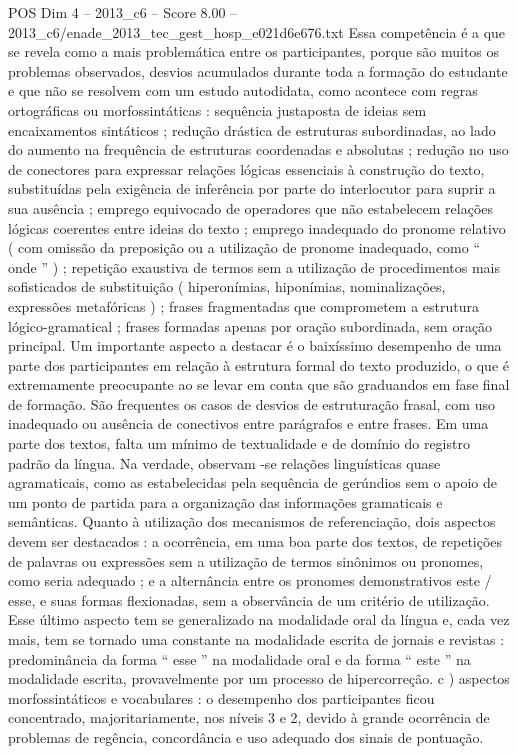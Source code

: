 \begin{textsample}{POS Dim 4 – 2013\_c6 – Score 8.00 – 2013\_c6/enade\_2013\_tec\_gest\_hosp\_e021d6e676.txt}
Essa competência é a que se revela como a mais problemática entre os participantes, porque são muitos os problemas observados, desvios acumulados durante toda a formação do estudante e que não se resolvem com um estudo autodidata, como acontece com regras ortográficas ou morfossintáticas : sequência justaposta de ideias sem encaixamentos sintáticos ; redução drástica de estruturas subordinadas, ao lado do aumento na frequência de estruturas coordenadas e absolutas ; redução no uso de conectores para expressar relações lógicas essenciais à construção do texto, substituídas pela exigência de inferência por parte do interlocutor para suprir a sua ausência ; emprego equivocado de operadores que não estabelecem relações lógicas coerentes entre ideias do texto ; emprego inadequado do pronome relativo ( com omissão da preposição ou a utilização de pronome inadequado, como “ onde ” ) ; repetição exaustiva de termos sem a utilização de procedimentos mais sofisticados de substituição ( hiperonímias, hiponímias, nominalizações, expressões metafóricas ) ; frases fragmentadas que comprometem a estrutura lógico-gramatical ; frases formadas apenas por oração subordinada, sem oração principal.
Um importante aspecto a destacar é o baixíssimo desempenho de uma parte dos participantes em relação à estrutura formal do texto produzido, o que é extremamente preocupante ao se levar em conta que são graduandos em fase final de formação.
São frequentes os casos de desvios de estruturação frasal, com uso inadequado ou ausência de conectivos entre parágrafos e entre frases.
Em uma parte dos textos, falta um mínimo de textualidade e de domínio do registro padrão da língua.
Na verdade, observam -se relações linguísticas quase agramaticais, como as estabelecidas pela sequência de gerúndios sem o apoio de um ponto de partida para a organização das informações gramaticais e semânticas.
Quanto à utilização dos mecanismos de referenciação, dois aspectos devem ser destacados : a ocorrência, em uma boa parte dos textos, de repetições de palavras ou expressões sem a utilização de termos sinônimos ou pronomes, como seria adequado ; e a alternância entre os pronomes demonstrativos este / esse, e suas formas flexionadas, sem a observância de um critério de utilização.
Esse último aspecto tem se generalizado na modalidade oral da língua e, cada vez mais, tem se tornado uma constante na modalidade escrita de jornais e revistas : predominância da forma “ esse ” na modalidade oral e da forma “ este ” na modalidade escrita, provavelmente por um processo de hipercorreção. c ) aspectos morfossintáticos e vocabulares : o desempenho dos participantes ficou concentrado, majoritariamente, nos níveis 3 e 2, devido à grande ocorrência de problemas de regência, concordância e uso adequado dos sinais de pontuação.

\end{textsample}
